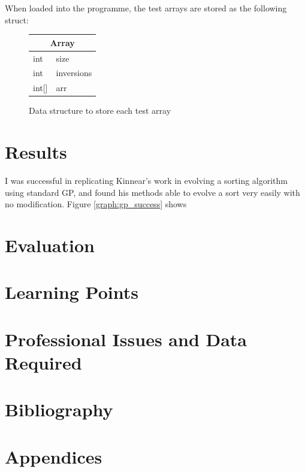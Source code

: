 \documentclass{article}
\begin{document}
When loaded into the programme, the test arrays are stored as the following struct:

\begin{figure}[h]
	\centering
	\begin{tabular}{|l l|}
		\hline
		\multicolumn{2}{|c|}{Array}\\
		\hline
		int & size \\
		int & inversions\\
		int[] & arr\\
		\hline
	\end{tabular}
	\caption{Data structure to store each test array}
	
	\label{struct:array}
\end{figure}

\section{Results}

	I was successful in replicating Kinnear's work in evolving a sorting algorithm using standard GP, and found his methods able to evolve a sort very easily with no modification. Figure \ref{graph:gp_success} shows 
\section{Evaluation}

\section{Learning Points}

\section{Professional Issues and Data Required}

\section{Bibliography}




\section{Appendices}
\end{document}
